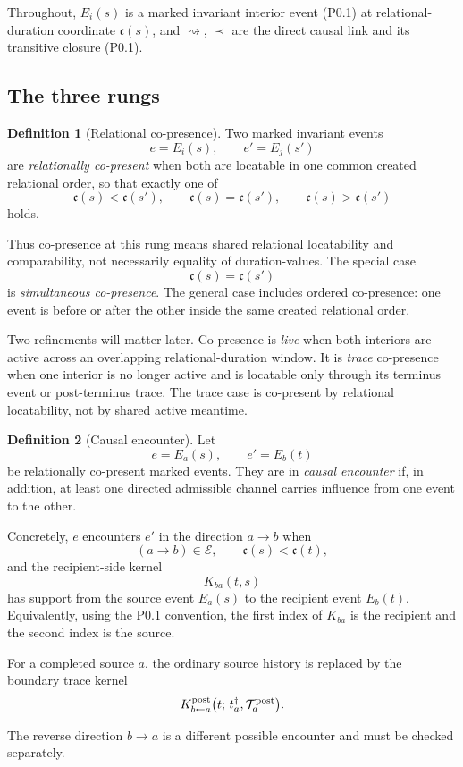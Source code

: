 \documentclass[11pt,a4paper]{article}
\theoremstyle{definition}
\newtheorem{definition}{Definition}[section]
\theoremstyle{plain}
\theoremstyle{remark}
\begin{document}
Throughout, \(E_i(s)\) is a marked invariant interior event (P0.1) at relational-duration
coordinate \(\mathfrak c(s)\), and \(\rightsquigarrow\), \(\prec\) are the direct causal
link and its transitive closure (P0.1).

\subsection{The three rungs}

\begin{definition}[Relational co-presence]\label{def:copres}
Two marked invariant events
\[
e=E_i(s),
\qquad
e'=E_j(s')
\]
are \emph{relationally co-present} when both are locatable in one common created
relational order, so that exactly one of
\[
\mathfrak c(s)<\mathfrak c(s'),
\qquad
\mathfrak c(s)=\mathfrak c(s'),
\qquad
\mathfrak c(s)>\mathfrak c(s')
\]
holds.

Thus co-presence at this rung means shared relational locatability and
comparability, not necessarily equality of duration-values. The special case
\[
\mathfrak c(s)=\mathfrak c(s')
\]
is \emph{simultaneous co-presence}. The general case includes ordered
co-presence: one event is before or after the other inside the same created
relational order.
\end{definition}

\noindent Two refinements will matter later. Co-presence is \emph{live} when both
interiors are active across an overlapping relational-duration window. It is \emph{trace}
co-presence when one interior is no longer active and is locatable only through its
terminus event or post-terminus trace. The trace case is co-present by relational
locatability, not by shared active meantime.

\begin{definition}[Causal encounter]\label{def:causenc}
Let
\[
e=E_a(s),
\qquad
e'=E_b(t)
\]
be relationally co-present marked events. They are in \emph{causal encounter} if,
in addition, at least one directed admissible channel carries influence from one
event to the other.

Concretely, \(e\) encounters \(e'\) in the direction \(a\to b\) when
\[
(a\to b)\in\mathcal E,
\qquad
\mathfrak c(s)<\mathfrak c(t),
\]
and the recipient-side kernel
\[
K_{ba}(t,s)
\]
has support from the source event \(E_a(s)\) to the recipient event \(E_b(t)\).
Equivalently, using the P0.1 convention, the first index of \(K_{ba}\) is the
recipient and the second index is the source.

For a completed source \(a\), the ordinary source history is replaced by the
boundary trace kernel
\[
K^{\rm post}_{b\leftarrow a}
\bigl(t;\,t_a^\dagger,\mathcal T_a^{\rm post}\bigr).
\]

The reverse direction \(b\to a\) is a different possible encounter and must be
checked separately.
\end{definition}
\end{document}
